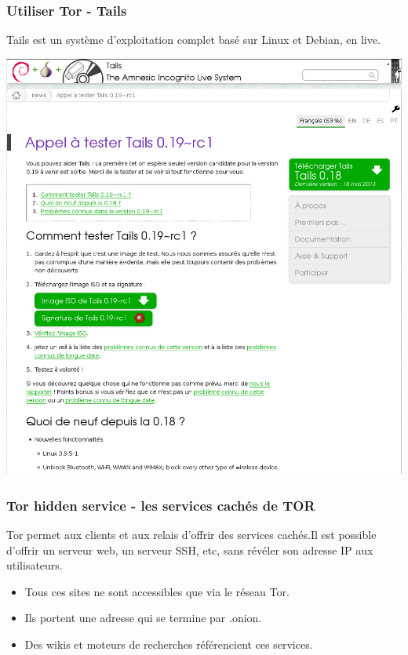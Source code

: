 \documentclass{beamer}
\begin{document}
\begin{frame}
\frametitle{Utiliser Tor - Tails}

Tails est un système d'exploitation complet basé sur Linux et Debian, en live.
\begin{center}
\includegraphics[keepaspectratio,width=\textwidth, height=.8\textheight]{images/tails}
\end{center}
\end{frame}

\begin{frame}
\frametitle{Tor hidden service - les services cachés de TOR}

Tor permet aux clients et aux relais d’offrir des services cachés.Il est possible d'offrir un serveur web, un serveur SSH, etc, sans révéler son adresse IP aux utilisateurs.
\begin{itemize}
\item Tous ces sites ne sont accessibles que via le réseau Tor.
\item Ils portent une adresse qui se termine par .onion.
\item Des wikis et moteurs de recherches référencient ces services.
\end{itemize}
\end{frame}
\end{document}
